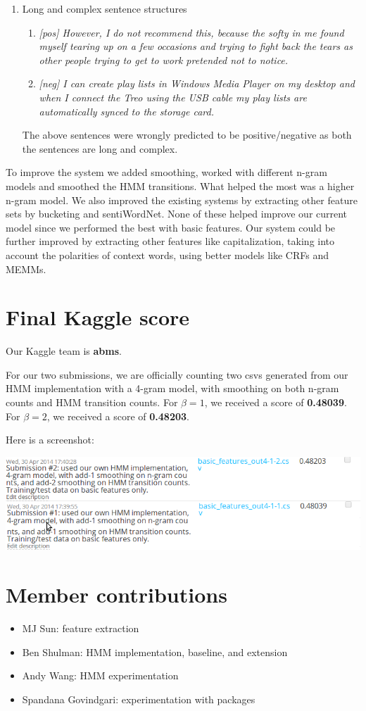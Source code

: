 \documentclass{article}
\begin{document}
\begin{enumerate}
\item Long and complex sentence structures
    \begin{enumerate}
    \item \textit{[pos] However, I do not recommend this, because the softy in me found myself tearing up on a few occasions and     trying to fight back the tears as other people trying to get to work pretended not to notice.      
    }
    \item \textit{[neg] I can create play lists in Windows Media Player on my desktop and when I connect the Treo using the USB     cable my play lists are automatically synced to the storage card.}
\end{enumerate}
The above sentences were wrongly predicted to be positive/negative as both the sentences are long and complex.
\end{enumerate}

To improve the system we added smoothing, worked with different n-gram models and smoothed the HMM transitions. What helped the most was a higher n-gram model. We also improved the existing systems by extracting other feature sets by bucketing and sentiWordNet. None of these helped improve our current model since we performed the best with basic features. Our system could be further improved by extracting other features like capitalization, taking into account the polarities of context words, using better models like CRFs and MEMMs.\par

\newpage
\section{Final Kaggle score}
Our Kaggle team is \textbf{abms}.\par
For our two submissions, we are officially counting two csvs generated from our HMM implementation with a 4-gram model, with smoothing on both n-gram counts and HMM transition counts. For $\beta = 1$, we received a score of \textbf{0.48039}. For $\beta = 2$, we received a score of \textbf{0.48203}.\par\bigskip

Here is a screenshot:\par\medskip
\noindent
\includegraphics[width=\textwidth]{kagglesubs.png}\par\bigskip

\section{Member contributions}
\begin{itemize}[noitemsep]
  \item MJ Sun: feature extraction
  \item Ben Shulman: HMM implementation, baseline, and extension
  \item Andy Wang: HMM experimentation
  \item Spandana Govindgari: experimentation with packages
\end{itemize}
\end{document}
